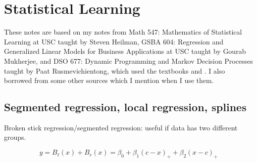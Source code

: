 %
%
%
%
%
%
%
%
%
%
%
%
%
%

\chapter{Statistical Learning}

These notes are based on my notes from Math 547: Mathematics of Statistical Learning at USC taught by Steven Heilman, GSBA 604: Regression and Generalized Linear Models for Business Applications at USC taught by Gourab Mukherjee, and DSO 677: Dynamic Programming and Markov Decision Processes taught by Paat Rusmevichientong, which used the textbooks \citep{v1_bertsekas2012dynamic} and \citep{v2_bertsekas2012dynamic}. I also borrowed from some other sources which I mention when I use them.




\section{Segmented regression, local regression, splines}

Broken stick regression/segmented regression: useful if data has two different groups. 

\[
y = B_\ell(x) + B_r(x) = \beta_0 + \beta_1(c-x)_+ + \beta_2(x -c)_+
\]

